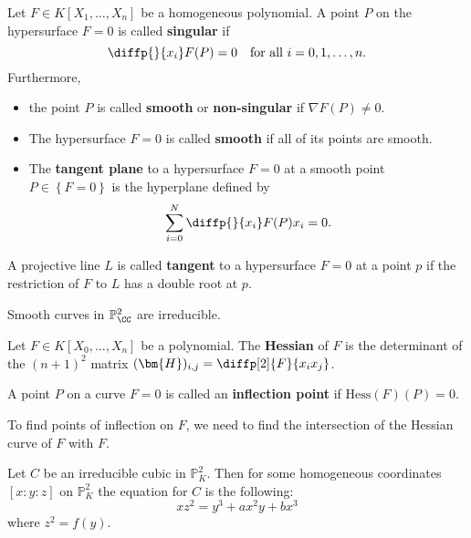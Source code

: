 \documentclass[12pt, a4paper]{article}
\newcommand{\PP}{\mathbb P}
\begin{document}
\begin{definition}
    Let \(F \in K[X_1,\ldots,X_n]\) be a homogeneous polynomial. A point \(P\) on the hypersurface \(F=0\) is called \textbf{singular} if 
    \[\diffp{}{{x_i}} F(P)= 0 \quad \text{for all } i =0,1,\ldots,n.\]
    Furthermore, 
    \begin{itemize}
        \item the point \(P\) is called \textbf{smooth} or \textbf{non-singular} if \(\nabla F(P)\neq 0\).
        \item The hypersurface \(F=0\) is called \textbf{smooth} if all of its points are smooth.
        \item The \textbf{tangent plane} to a hypersurface \(F=0\) at a smooth point \(P \in \left\{ F=0 \right\}\) is the hyperplane defined by 
        \[\sum_{i=0}^N \diffp{}{{x_i}}F(P)x_i =0.\]
    \end{itemize}
\end{definition}

\begin{definition}
    A projective line \(L\) is called \textbf{tangent} to a hypersurface \(F=0\) at a point \(p\) if the restriction of \(F\) to \(L\) has a double root at \(p\). 
\end{definition}

\begin{theorem}
    Smooth curves in \(\PP^2_\CC\) are irreducible.
\end{theorem}

\begin{definition}
    Let \(F \in K[X_0,\ldots,X_n]\) be a polynomial. The \textbf{Hessian} of \(F\) is the determinant of the \((n+1)^2\) matrix \((\bm{H})_{i,j} = \diffp[2]{F}{{x_i x_j}}\).
\end{definition}

\begin{definition}
    A point \(P\) on a curve \(F=0\) is called an \textbf{inflection point} if \(\text{Hess}(F)(P)=0\). 
\end{definition}

\begin{mdnote}
    To find points of inflection on \(F\), we need to find the intersection of the Hessian curve of \(F\) with \(F\).
\end{mdnote}

\begin{mdthm}
    Let \(C\) be an irreducible cubic in \(\PP^2_K\). Then for some homogeneous coordinates \([x:y:z]\) on \(\PP^2_K\) the equation for \(C\) is the following:
    \[xz^2=y^3+ax^2y+bx^3\]
    where \(z^2 = f(y)\).
\end{mdthm}
\end{document}
